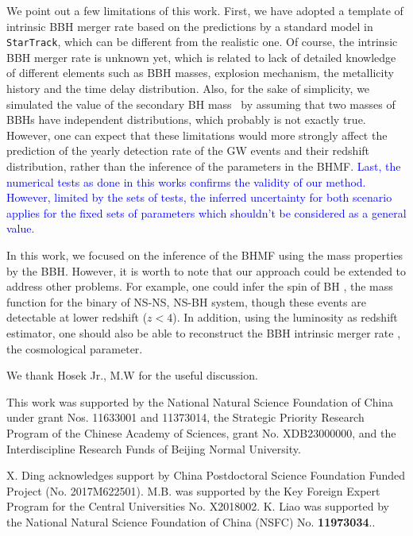 \documentclass[twocolumn]{aastex62}
\newcommand{\blue}[1]{\textcolor{blue}{#1}}
\begin{document}
We point out a few limitations of this work. First, we have adopted a template of intrinsic BBH merger rate based on the predictions by a standard model in {\tt StarTrack}, which can be different from the realistic one. Of course, the intrinsic BBH merger rate is unknown yet, which is related to 
lack of detailed knowledge of different elements such as BBH masses, explosion mechanism, the metallicity history and the time delay distribution. Also, for the sake of simplicity, we simulated the value of the secondary BH mass \mtwo\ by assuming that two masses of BBHs have independent distributions, which probably is not exactly true. However, one can expect that these limitations would more strongly affect the prediction of the yearly detection rate of the GW events and their redshift distribution, rather than the inference of the parameters in the BHMF.
\blue{Last, the numerical tests as done in this works confirms the validity of our method. However, limited by the sets of tests, the inferred uncertainty for both scenario applies for the fixed sets of parameters which shouldn't be considered as a general value.}

In this work, we focused on the inference of the BHMF using the mass properties by the BBH. However, it is worth to note that our approach could be extended to address other problems. For example, one could infer the spin of BH \citep{Abbott2018b}, the mass function for the binary of NS-NS, NS-BH system, though these events are detectable at lower redshift ($z<4$). In addition, using the luminosity as redshift estimator, one should also be able to reconstruct the BBH intrinsic merger rate \citep{Fishbach2018}, the cosmological parameter.


\acknowledgments
We thank Hosek Jr., M.W for the useful discussion.

This work was supported by the National Natural Science Foundation of China under grant Nos. 11633001 and 11373014, the Strategic Priority Research Program of the Chinese Academy of Sciences, grant No. XDB23000000, and the Interdiscipline Research Funds of Beijing Normal University.

X. Ding acknowledges support by China Postdoctoral Science Foundation Funded Project (No. 2017M622501).
M.B. was supported by the Key Foreign Expert Program for the Central Universities No. X2018002.
K. Liao was supported by the National Natural Science Foundation of China (NSFC) No. {\bf 11973034}..
\end{document}
